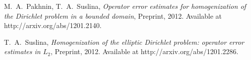 \documentclass[10pt,a4paper]{article}
\begin{document}
\begin{thebibliography}{6}

 M.~A.~Pakhnin, T.~A.~Suslina, \textit{Operator error estimates for homogenization of the
Dirichlet problem in a bounded domain}, Preprint, 2012. Available at
http://arxiv.org/abs/1201.2140.


 T.~A.~Suslina, \textit{Homogenization of the elliptic Dirichlet problem:
operator error estimates in $L_2$}, Preprint, 2012. Available at http://arxiv.org/abs/1201.2286.




\end{thebibliography}
\end{document}
